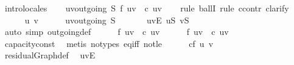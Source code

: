 \begin{isabellebody}
\ intro{\isacharunderscore}locales\isanewline
\isanewline
\ \ \isamarkupfalse%
\ {\isachardoublequoteopen}{\isasymforall}{\isacharparenleft}u{\isacharcomma}v{\isacharparenright}{\isasymin}outgoing{\isacharprime}\ {\isacharquery}S{\isachardot}\ f\ {\isacharparenleft}u{\isacharcomma}v{\isacharparenright}\ {\isacharequal}\ c\ {\isacharparenleft}u{\isacharcomma}v{\isacharparenright}{\isachardoublequoteclose}\isanewline
\ \ \isamarkupfalse%
\ {\isacharparenleft}rule\ ballI{\isacharcomma}\ rule\ ccontr{\isacharcomma}\ clarify{\isacharparenright}\ %
\isanewline
\ \ \ \ \isamarkupfalse%
\ u\ v\isanewline
\ \ \ \ \isamarkupfalse%
\ {\isachardoublequoteopen}{\isacharparenleft}u{\isacharcomma}v{\isacharparenright}{\isasymin}outgoing{\isacharprime}\ {\isacharquery}S{\isachardoublequoteclose}\ \isanewline
\ \ \ \ \isamarkupfalse%
\ {\isachardoublequoteopen}{\isacharparenleft}u{\isacharcomma}v{\isacharparenright}{\isasymin}E{\isachardoublequoteclose}\ {\isachardoublequoteopen}u{\isasymin}{\isacharquery}S{\isachardoublequoteclose}\ {\isachardoublequoteopen}v{\isasymnotin}{\isacharquery}S{\isachardoublequoteclose}\isanewline
\ \ \ \ \ \ \isamarkupfalse%
\ {\isacharparenleft}auto\ simp{\isacharcolon}\ outgoing{\isacharprime}{\isacharunderscore}def{\isacharparenright}\isanewline
\ \ \ \ \isamarkupfalse%
\ {\isachardoublequoteopen}f\ {\isacharparenleft}u{\isacharcomma}v{\isacharparenright}\ {\isasymnoteq}\ c\ {\isacharparenleft}u{\isacharcomma}v{\isacharparenright}{\isachardoublequoteclose}\isanewline
\ \ \ \ \isamarkupfalse%
\ {\isachardoublequoteopen}f\ {\isacharparenleft}u{\isacharcomma}v{\isacharparenright}\ {\isacharless}\ c\ {\isacharparenleft}u{\isacharcomma}v{\isacharparenright}{\isachardoublequoteclose}\ \isanewline
\ \ \ \ \ \ \isamarkupfalse%
\ capacity{\isacharunderscore}const\ \isamarkupfalse%
\ {\isacharparenleft}metis\ {\isacharparenleft}no{\isacharunderscore}types{\isacharparenright}\ eq{\isacharunderscore}iff\ not{\isacharunderscore}le{\isacharparenright}\isanewline
\ \ \ \ \isamarkupfalse%
\ {\isachardoublequoteopen}cf\ {\isacharparenleft}u{\isacharcomma}\ v{\isacharparenright}\ {\isasymnoteq}\ {}{\isachardoublequoteclose}\ \isanewline
\ \ \ \ \ \ \isamarkupfalse%
\ residualGraph{\isacharunderscore}def\ \isamarkupfalse%
\ {\isacartoucheopen}{\isacharparenleft}u{\isacharcomma}v{\isacharparenright}{\isasymin}E{\isacartoucheclose}\ \isamarkupfalse%

\end{isabellebody}

